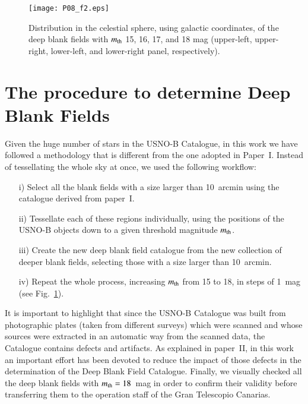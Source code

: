 \documentclass[11pt,twoside]{article}
\begin{document}
\begin{figure}
\centerline{%
\texttt{[image: P08\_f2.eps]}}
\caption{Distribution in the celestial sphere, using galactic coordinates, of
the deep blank fields with $m_{\mbox{\scriptsize th}}$ 15, 16, 17, and 18 mag 
(upper-left, upper-right, lower-left, and lower-right panel, respectively).}
\label{result_DBF}
\end{figure}


\section{The procedure to determine Deep Blank Fields}

Given the huge number of stars in the USNO-B Catalogue, in this work we have
followed a methodology that is different from the one adopted in Paper~I.
Instead of tessellating the whole sky at once, we
used the following workflow:
\begin{itemize}
  \item[i)] Select all the blank fields with a size larger than 10~arcmin using
  the catalogue derived from paper~I.
  \item[ii)] Tessellate each of these regions individually, using the positions
  of the USNO-B objects down to a given threshold magnitude
  $m_{\mbox{\scriptsize th}}$.
  \item[iii)] Create the new deep blank field catalogue from the new collection
  of deeper blank fields, selecting those with a size larger than 10~arcmin.
  \item[iv)] Repeat the whole process, increasing 
  $m_{\mbox{\scriptsize th}}$ from 15 to 18, in steps of 1~mag (see
  Fig.~\ref{result_DBF}).
\end{itemize}

It is important to highlight that since the USNO-B Catalogue was built from
photographic plates (taken from different surveys) which were scanned and whose
sources were extracted in an automatic way from the scanned data, the Catalogue
contains defects and artifacts. As explained in paper~II, in this work an
important effort has been devoted to reduce the impact of those defects in the
determination of the Deep Blank Field Catalogue. Finally, we visually checked
all the deep blank fields with $m_{\mbox{\scriptsize th}}=18$~mag in order to
confirm their validity before transferring them to the operation staff of the
Gran Telescopio Canarias.
\end{document}
